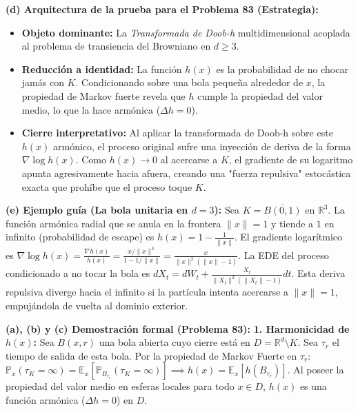 \documentclass[11pt, letterpaper]{article}
\begin{document}
\begin{solucion}
    \textbf{(d) Arquitectura de la prueba para el Problema 83 (Estrategia):}
    \begin{itemize}
        \item[(i)] \textbf{Objeto dominante:} La \textit{Transformada de Doob-h} multidimensional acoplada al problema de transiencia del Browniano en $d \ge 3$.
        \item[(ii)] \textbf{Reducción a identidad:} La función $h(x)$ es la probabilidad de no chocar jamás con $K$. Condicionando sobre una bola pequeña alrededor de $x$, la propiedad de Markov fuerte revela que $h$ cumple la propiedad del valor medio, lo que la hace armónica ($\Delta h = 0$).
        \item[(iii)] \textbf{Cierre interpretativo:} Al aplicar la transformada de Doob-h sobre este $h(x)$ armónico, el proceso original sufre una inyección de deriva de la forma $\nabla \log h(x)$. Como $h(x) \to 0$ al acercarse a $K$, el gradiente de su logaritmo apunta agresivamente hacia afuera, creando una "fuerza repulsiva" estocástica exacta que prohíbe que el proceso toque $K$.
    \end{itemize}

    \vspace{3mm}
    \textbf{(e) Ejemplo guía (La bola unitaria en $d=3$):}
    Sea $K = \overline{B(0,1)}$ en $\mathbb{R}^3$. La función armónica radial que se anula en la frontera $\|x\|=1$ y tiende a $1$ en infinito (probabilidad de escape) es $h(x) = 1 - \frac{1}{\|x\|}$.
    El gradiente logarítmico es $\nabla \log h(x) = \frac{\nabla h(x)}{h(x)} = \frac{x/\|x\|^3}{1 - 1/\|x\|} = \frac{x}{\|x\|^2(\|x\|-1)}$.
    La EDE del proceso condicionado a no tocar la bola es $dX_t = dW_t + \frac{X_t}{\|X_t\|^2(\|X_t\|-1)} dt$. Esta deriva repulsiva diverge hacia el infinito si la partícula intenta acercarse a $\|x\| = 1$, empujándola de vuelta al dominio exterior.

    \textbf{(a), (b) y (c) Demostración formal (Problema 83):}
    \textbf{1. Harmonicidad de $h(x)$:}
    Sea $B(x, r)$ una bola abierta cuyo cierre está en $D = \mathbb{R}^d \setminus K$. Sea $\tau_r$ el tiempo de salida de esta bola. Por la propiedad de Markov Fuerte en $\tau_r$:
    $\mathbb{P}_x(\tau_K = \infty) = \mathbb{E}_x [ \mathbb{P}_{B_{\tau_r}} (\tau_K = \infty) ] \implies h(x) = \mathbb{E}_x [ h(B_{\tau_r}) ]$.
    Al poseer la propiedad del valor medio en esferas locales para todo $x \in D$, $h(x)$ es una función armónica ($\Delta h = 0$) en $D$.
    

\end{solucion}
\end{document}
